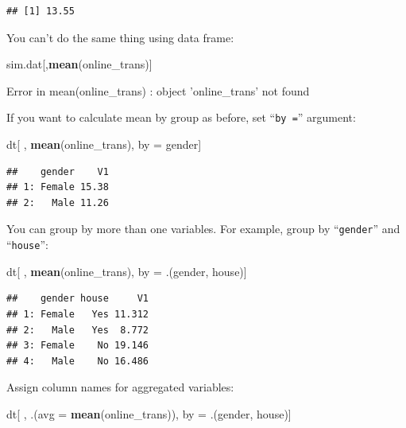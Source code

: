 \documentclass[12pt,]{krantz}
\makeatletter
\newenvironment{Shaded}{\begin{snugshade}}{\end{snugshade}}
\newcommand{\DataTypeTok}[1]{\textcolor[rgb]{0.27,0.27,0.27}{#1}}
\newcommand{\KeywordTok}[1]{\textcolor[rgb]{0.27,0.27,0.27}{\textbf{#1}}}
\newcommand{\NormalTok}[1]{#1}
\newcommand{\StringTok}[1]{\textcolor[rgb]{0.5,0.5,0.5}{#1}}
\newenvironment{kframe}{%
\medskip{}
\setlength{\fboxsep}{.8em}
 \def\at@end@of@kframe{}%
 \ifinner\ifhmode%
  \def\at@end@of@kframe{\end{minipage}}%
  \begin{minipage}{\columnwidth}%
 \fi\fi%
 \def\FrameCommand##1{\hskip\@totalleftmargin \hskip-\fboxsep
 \colorbox{shadecolor}{##1}\hskip-\fboxsep
     \hskip-\linewidth \hskip-\@totalleftmargin \hskip\columnwidth}%
 \MakeFramed {\advance\hsize-\width
   \@totalleftmargin\z@ \linewidth\hsize
   \@setminipage}}%
 {\par\unskip\endMakeFramed%
 \at@end@of@kframe}
\renewenvironment{Shaded}{\begin{kframe}}{\end{kframe}}
\makeatother
\begin{document}
\begin{verbatim}
## [1] 13.55
\end{verbatim}

You can't do the same thing using data frame:

\begin{Shaded}
\begin{Highlighting}[]
\NormalTok{sim.dat[,}\KeywordTok{mean}\NormalTok{(online_trans)]}
\end{Highlighting}
\end{Shaded}

\begin{Shaded}
\begin{Highlighting}[]
\NormalTok{Error in mean(online_trans) : object 'online_trans' not found}
\end{Highlighting}
\end{Shaded}

If you want to calculate mean by group as before, set ``\texttt{by\ =}'' argument:

\begin{Shaded}
\begin{Highlighting}[]
\NormalTok{dt[ , }\KeywordTok{mean}\NormalTok{(online_trans), by =}\StringTok{ }\NormalTok{gender]}
\end{Highlighting}
\end{Shaded}

\begin{verbatim}
##    gender    V1
## 1: Female 15.38
## 2:   Male 11.26
\end{verbatim}

You can group by more than one variables. For example, group by ``\texttt{gender}'' and ``\texttt{house}'':

\begin{Shaded}
\begin{Highlighting}[]
\NormalTok{dt[ , }\KeywordTok{mean}\NormalTok{(online_trans), by =}\StringTok{ }\NormalTok{.(gender, house)]}
\end{Highlighting}
\end{Shaded}

\begin{verbatim}
##    gender house     V1
## 1: Female   Yes 11.312
## 2:   Male   Yes  8.772
## 3: Female    No 19.146
## 4:   Male    No 16.486
\end{verbatim}

Assign column names for aggregated variables:

\begin{Shaded}
\begin{Highlighting}[]
\NormalTok{dt[ , .(}\DataTypeTok{avg =} \KeywordTok{mean}\NormalTok{(online_trans)), by =}\StringTok{ }\NormalTok{.(gender, house)]}
\end{Highlighting}
\end{Shaded}
\end{document}
